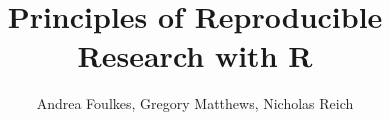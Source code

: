 

\title{Principles of Reproducible Research with R}
\newcommand{\ModuleShortname}{shortName}
\author{Andrea Foulkes, Gregory Matthews, Nicholas Reich}
\newcommand{\LicenseText}{Made available under the Creative Commons Attribution-ShareAlike 3.0 Unported License: http://creativecommons.org/licenses/by-sa/3.0/deed.en\textunderscore US }
\newcommand{\Instructor}{}
\newcommand{\Course}{Biostatistics in Practice: Research Training in High-Performance Computing with R}






\begin{frame}[plain]
	\titlepage
\end{frame}







